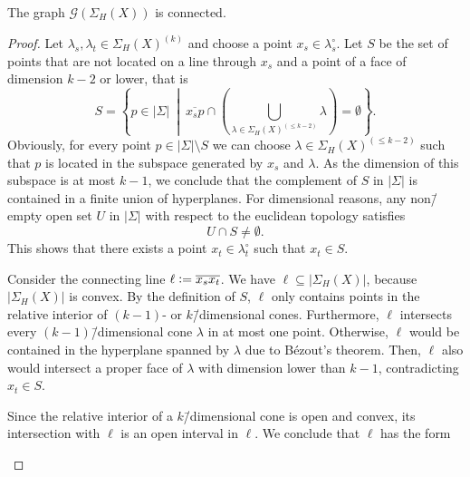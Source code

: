 \begin{prop}
	\label{proposition:git_fan_connected}
	The graph $\mathcal{G}(\Sigma_H(X))$ is connected.
\end{prop}
\begin{proof}
	Let $\lambda_s, \lambda_t\in\Sigma_H(X)^{(k)}$ and choose a point $x_s\in\lambda_s^\circ$. Let $S$ be the set of points that are not located on a line through $x_s$ and a point of a face of dimension $k-2$ or lower, that is
	$$S = \left\{p\in|\Sigma|\ \middle|\ \overline{x_s p} \cap \left(\bigcup_{\lambda\in\Sigma_H(X)^{(\leq k-2)}} \lambda\right) = \emptyset\right\}.$$
	Obviously, for every point $p\in |\Sigma|\setminus S$ we can choose $\lambda\in\Sigma_H(X)^{(\leq k-2)}$ such that $p$ is located in the subspace generated by $x_s$ and $\lambda$. As the dimension of this subspace is at most $k-1$, we conclude that the complement of $S$ in $|\Sigma|$ is contained in a finite union of hyperplanes.
	For dimensional reasons, any non\=/empty open set $U$ in $|\Sigma|$ with respect to the euclidean topology satisfies
	$$U\cap S \neq \emptyset.$$
	This shows that there exists a point $x_t\in\lambda_t^\circ$ such that $x_t\in S$.
	
	Consider the connecting line $\ell \mathrel{\mathop:}= \overline{x_s x_t}$. We have $\ell\subseteq|\Sigma_H(X)|$, because $|\Sigma_H(X)|$ is convex. By the definition of $S$, $\ell$ only contains points in the relative interior of $(k-1)$- or $k$\=/dimensional cones. Furthermore, $\ell$ intersects every $(k-1)$\=/dimensional cone $\lambda$ in at most one point. Otherwise, $\ell$ would be contained in the hyperplane spanned by $\lambda$ due to Bézout's theorem. Then, $\ell$ also would intersect a proper face of $\lambda$ with dimension lower than $k-1$, contradicting $x_t\in S$.
	
	Since the relative interior of a $k$\=/dimensional cone is open and convex, its intersection with $\ell$ is an open interval in $\ell$. We conclude that $\ell$ has the form
	
	\begin{center}
\end{center}
\end{proof}
